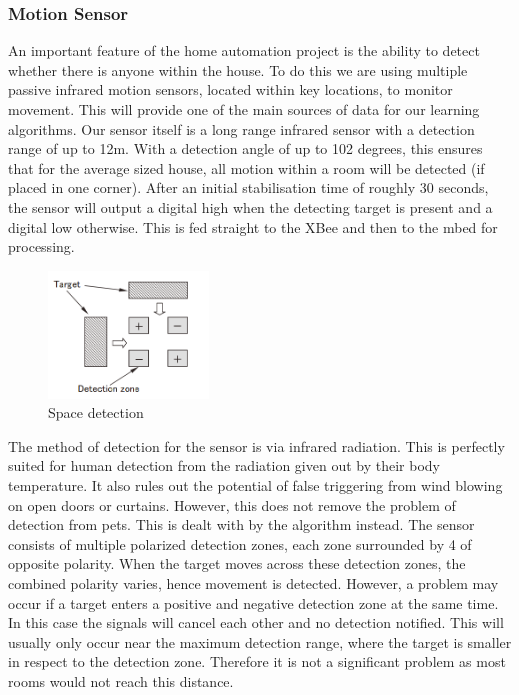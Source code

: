\documentclass[10.5pt,a4paper,twoside]{report}   %
\begin{document}
\subsubsection{Motion Sensor}
An important feature of the home automation project is the ability to detect whether there is anyone within the house. To do this we are using multiple passive infrared motion sensors, located within key locations, to monitor movement. This will provide one of the main sources of data for our learning algorithms. 
Our sensor itself is a long range infrared sensor with a detection range of up to 12m. With a detection angle of up to 102 degrees, this ensures that for the average sized house, all motion within a room will be detected (if placed in one corner). After an initial stabilisation time of roughly 30 seconds, the sensor will output a digital high when the detecting target is present and a digital low otherwise. This is fed straight to the XBee and then to the mbed for processing. 

\begin{figure}
  \vspace{-20pt}
  \begin{center}
    \includegraphics[width=0.38\textwidth]{images/motionsens.png}
  \end{center}
  \vspace{-20pt}
  \caption{Space detection}
  \vspace{-10pt}
\end{figure}

The method of detection for the sensor is via infrared radiation. This is perfectly suited for human detection from the radiation given out by their body temperature. It also rules out the potential of false triggering from wind blowing on open doors or curtains. However, this does not remove the problem of detection from pets. This is dealt with by the algorithm instead. The sensor consists of multiple polarized detection zones, each zone surrounded by 4 of opposite polarity. When the target moves across these detection zones, the combined polarity varies, hence movement is detected. However, a problem may occur if a target enters a positive and negative detection zone at the same time. In this case the signals will cancel each other and no detection notified. This will usually only occur near the maximum detection range, where the target is smaller in respect to the detection zone. Therefore it is not a significant problem as most rooms would not reach this distance.  
\end{document}
